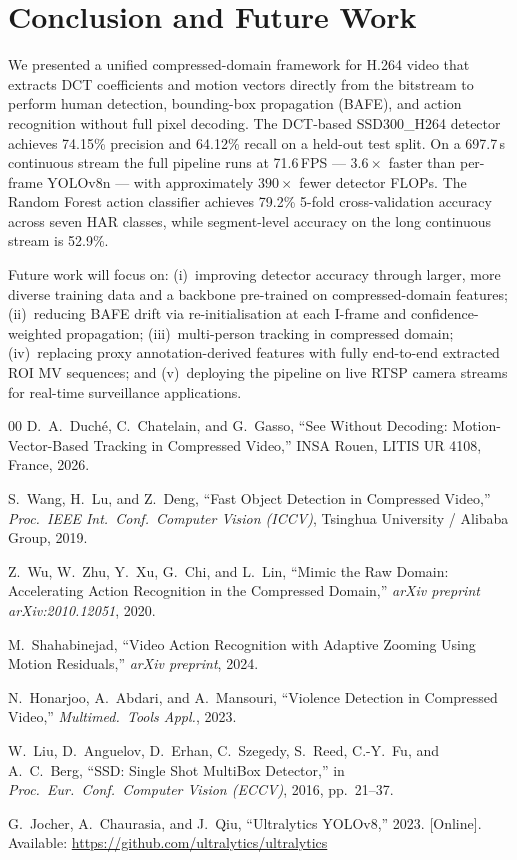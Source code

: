 \documentclass[conference]{IEEEtran}
\begin{document}
\section{Conclusion and Future Work}

We presented a unified compressed-domain framework for H.264 video that extracts DCT coefficients and motion vectors directly from the bitstream to perform human detection, bounding-box propagation (BAFE), and action recognition without full pixel decoding. The DCT-based SSD300\_H264 detector achieves 74.15\% precision and 64.12\% recall on a held-out test split. On a 697.7\,s continuous stream the full pipeline runs at 71.6\,FPS — $3.6\!\times$ faster than per-frame YOLOv8n — with approximately $390\!\times$ fewer detector FLOPs. The Random Forest action classifier achieves 79.2\% 5-fold cross-validation accuracy across seven HAR classes, while segment-level accuracy on the long continuous stream is 52.9\%.

Future work will focus on: (i)~improving detector accuracy through larger, more diverse training data and a backbone pre-trained on compressed-domain features; (ii)~reducing BAFE drift via re-initialisation at each I-frame and confidence-weighted propagation; (iii)~multi-person tracking in compressed domain; (iv)~replacing proxy annotation-derived features with fully end-to-end extracted ROI MV sequences; and (v)~deploying the pipeline on live RTSP camera streams for real-time surveillance applications.

\begin{thebibliography}{00}
D.~A.~Duch\'e, C.~Chatelain, and G.~Gasso, ``See Without Decoding: Motion-Vector-Based Tracking in Compressed Video,'' INSA Rouen, LITIS UR 4108, France, 2026.

S.~Wang, H.~Lu, and Z.~Deng, ``Fast Object Detection in Compressed Video,'' \emph{Proc.\ IEEE Int.\ Conf.\ Computer Vision (ICCV)}, Tsinghua University / Alibaba Group, 2019.

Z.~Wu, W.~Zhu, Y.~Xu, G.~Chi, and L.~Lin, ``Mimic the Raw Domain: Accelerating Action Recognition in the Compressed Domain,'' \emph{arXiv preprint arXiv:2010.12051}, 2020.

M.~Shahabinejad, ``Video Action Recognition with Adaptive Zooming Using Motion Residuals,'' \emph{arXiv preprint}, 2024.

N.~Honarjoo, A.~Abdari, and A.~Mansouri, ``Violence Detection in Compressed Video,'' \emph{Multimed.\ Tools Appl.}, 2023.

W.~Liu, D.~Anguelov, D.~Erhan, C.~Szegedy, S.~Reed, C.-Y.~Fu, and A.~C.~Berg, ``SSD: Single Shot MultiBox Detector,'' in \emph{Proc.\ Eur.\ Conf.\ Computer Vision (ECCV)}, 2016, pp.~21--37.

G.~Jocher, A.~Chaurasia, and J.~Qiu, ``Ultralytics YOLOv8,'' 2023. [Online]. Available: \url{https://github.com/ultralytics/ultralytics}
\end{thebibliography}
\end{document}
